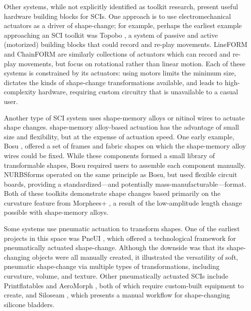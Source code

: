       Other systems, while not explicitly identified as toolkit research,
      present useful hardware building blocks for SCIs. One approach is to use
      electromechanical actuators as a driver of shape-change; for example,
      perhaps the earliest example approaching an SCI toolkit was Topobo
      \cite{Raffle:2004jj}, a system of passive and active (motorized) building
      blocks that could record and re-play movements. LineFORM
      \cite{Nakagaki:2015} and ChainFORM \cite{Nakagaki:2016} are similarly
      collections of actuators which can record and re-play movements, but focus
      on rotational rather than linear motion. Each of these systems is
      constrained by its actuators: using motors limits the minimum size,
      dictates the kinds of shape-change transformations available, and leads to
      high-complexity hardware, requiring custom circuitry that is unavailable
      to a casual user.
      
      Another type of SCI system uses shape-memory alloys or nitinol wires to
      actuate shape changes. shape-memory alloy-based actuation has the
      advantage of small size and flexibility, but at the expense of actuation
      speed. One early example, Bosu \cite{Parkes:2010}, offered a set of frames
      and fabric shapes on which the shape-memory alloy wires could be fixed.
      While these components formed a small library of transformable shapes,
      Bosu required users to assemble each component manually.  NURBSforms
      \cite{Tahouni:2020} operated on the same principle as Bosu, but used
      flexible circuit boards, providing a standardized---and potentially
      mass-manufacturable---format. Both of these toolkits demonstrate shape
      changes based primarily on the curvature feature from Morphees+
      \cite{10.1145/3173574.3174193}, a result of the low-amplitude length
      change possible with shape-memory alloys.
      
      Some systems use pneumatic actuation to transform shapes. One of the
      earliest projects in this space was PneUI \cite{Yao:2013}, which offered
      a technological framework for pneumatically actuated shape-change.
      Although the downside was that its shape-changing objects were all
      manually created, it illustrated the versatility of soft, pneumatic
      shape-change via multiple types of transformations, including curvature,
      volume, and texture. Other pneumatically actuated SCIs include
      Printflatables \cite{Sareen:2017} and AeroMorph
      \cite{Ou:2016}, both of which require custom-built equipment to create,
      and Siloseam \cite{Moradi:2020}, which presents a manual workflow for
      shape-changing silicone bladders.
      
